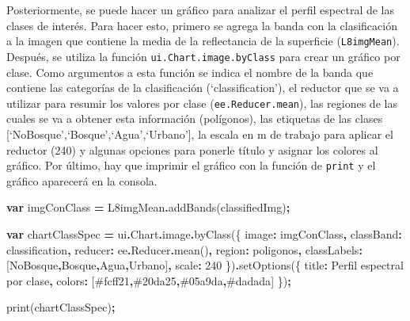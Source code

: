 \documentclass[
  12pt,
  letterpaper,
  twoside]{book}
\newenvironment{Shaded}{\begin{snugshade}}{\end{snugshade}}
\newcommand{\AttributeTok}[1]{\textcolor[rgb]{0.77,0.63,0.00}{#1}}
\newcommand{\DataTypeTok}[1]{\textcolor[rgb]{0.13,0.29,0.53}{#1}}
\newcommand{\DecValTok}[1]{\textcolor[rgb]{0.00,0.00,0.81}{#1}}
\newcommand{\FunctionTok}[1]{\textcolor[rgb]{0.00,0.00,0.00}{#1}}
\newcommand{\KeywordTok}[1]{\textcolor[rgb]{0.13,0.29,0.53}{\textbf{#1}}}
\newcommand{\NormalTok}[1]{#1}
\newcommand{\OperatorTok}[1]{\textcolor[rgb]{0.81,0.36,0.00}{\textbf{#1}}}
\newcommand{\StringTok}[1]{\textcolor[rgb]{0.31,0.60,0.02}{#1}}
\begin{document}
Posteriormente, se puede hacer un gráfico para analizar el perfil espectral de las clases de interés. Para hacer esto, primero se agrega la banda con la clasificación a la imagen que contiene la media de la reflectancia de la superficie (\texttt{L8imgMean}). Después, se utiliza la función \texttt{ui.Chart.image.byClass} para crear un gráfico por clase. Como argumentos a esta función se indica el nombre de la banda que contiene las categorías de la clasificación (`classification'), el reductor que se va a utilizar para resumir los valores por clase (\texttt{ee.Reducer.mean}), las regiones de las cuales se va a obtener esta información (polígonos), las etiquetas de las clases {[}`NoBosque',`Bosque',`Agua',`Urbano'{]}, la escala en m de trabajo para aplicar el reductor (240) y algunas opciones para ponerle título y asignar los colores al gráfico. Por último, hay que imprimir el gráfico con la función de \texttt{print} y el gráfico aparecerá en la consola.

\begin{Shaded}
\begin{Highlighting}[]
\KeywordTok{var}\NormalTok{ imgConClass }\OperatorTok{=}\NormalTok{ L8imgMean}\OperatorTok{.}\FunctionTok{addBands}\NormalTok{(classifiedImg)}\OperatorTok{;}
  
\KeywordTok{var}\NormalTok{ chartClassSpec }\OperatorTok{=}\NormalTok{ ui}\OperatorTok{.}\AttributeTok{Chart}\OperatorTok{.}\AttributeTok{image}\OperatorTok{.}\FunctionTok{byClass}\NormalTok{(\{}
  \DataTypeTok{image}\OperatorTok{:}\NormalTok{ imgConClass}\OperatorTok{,}
  \DataTypeTok{classBand}\OperatorTok{:} \StringTok{\textquotesingle{}classification\textquotesingle{}}\OperatorTok{,}
  \DataTypeTok{reducer}\OperatorTok{:}\NormalTok{ ee}\OperatorTok{.}\AttributeTok{Reducer}\OperatorTok{.}\FunctionTok{mean}\NormalTok{()}\OperatorTok{,}
  \DataTypeTok{region}\OperatorTok{:}\NormalTok{ poligonos}\OperatorTok{,}
  \DataTypeTok{classLabels}\OperatorTok{:}\NormalTok{ [}\StringTok{\textquotesingle{}NoBosque\textquotesingle{}}\OperatorTok{,}\StringTok{\textquotesingle{}Bosque\textquotesingle{}}\OperatorTok{,}\StringTok{\textquotesingle{}Agua\textquotesingle{}}\OperatorTok{,}\StringTok{\textquotesingle{}Urbano\textquotesingle{}}\NormalTok{]}\OperatorTok{,}
  \DataTypeTok{scale}\OperatorTok{:} \DecValTok{240}
\NormalTok{\})}\OperatorTok{.}\FunctionTok{setOptions}\NormalTok{(\{}
  \DataTypeTok{title}\OperatorTok{:} \StringTok{\textquotesingle{}Perfil espectral por clase\textquotesingle{}}\OperatorTok{,}
  \DataTypeTok{colors}\OperatorTok{:}\NormalTok{ [}\StringTok{\textquotesingle{}\#fcff21\textquotesingle{}}\OperatorTok{,}\StringTok{\textquotesingle{}\#20da25\textquotesingle{}}\OperatorTok{,}\StringTok{\textquotesingle{}\#05a9da\textquotesingle{}}\OperatorTok{,}\StringTok{\textquotesingle{}\#dadada\textquotesingle{}}\NormalTok{]}
\NormalTok{\})}\OperatorTok{;}

\FunctionTok{print}\NormalTok{(chartClassSpec)}\OperatorTok{;}
\end{Highlighting}
\end{Shaded}
\end{document}

